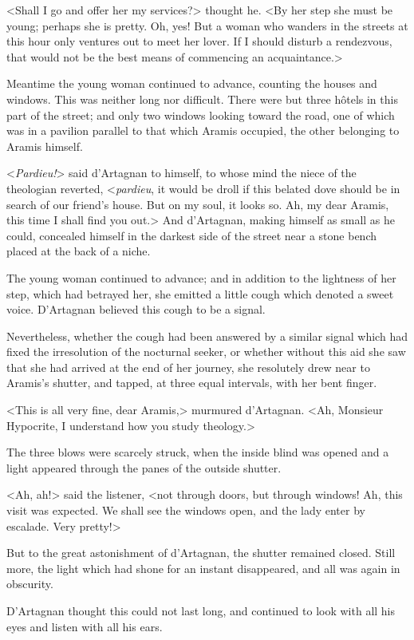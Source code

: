 <Shall I go and offer her my services?> thought he. <By her step she must be young; perhaps she is pretty. Oh, yes! But a woman who wanders in the streets at this hour only ventures out to meet her lover. If I should disturb a rendezvous, that would not be the best means of commencing an acquaintance.> 

Meantime the young woman continued to advance, counting the houses and windows. This was neither long nor difficult. There were but three hôtels in this part of the street; and only two windows looking toward the road, one of which was in a pavilion parallel to that which Aramis occupied, the other belonging to Aramis himself. 

<\textit{Pardieu!}> said d'Artagnan to himself, to whose mind the niece of the theologian reverted, <\textit{pardieu}, it would be droll if this belated dove should be in search of our friend's house. But on my soul, it looks so. Ah, my dear Aramis, this time I shall find you out.> And d'Artagnan, making himself as small as he could, concealed himself in the darkest side of the street near a stone bench placed at the back of a niche. 

The young woman continued to advance; and in addition to the lightness of her step, which had betrayed her, she emitted a little cough which denoted a sweet voice. D'Artagnan believed this cough to be a signal. 

Nevertheless, whether the cough had been answered by a similar signal which had fixed the irresolution of the nocturnal seeker, or whether without this aid she saw that she had arrived at the end of her journey, she resolutely drew near to Aramis's shutter, and tapped, at three equal intervals, with her bent finger. 

<This is all very fine, dear Aramis,> murmured d'Artagnan. <Ah, Monsieur Hypocrite, I understand how you study theology.> 

The three blows were scarcely struck, when the inside blind was opened and a light appeared through the panes of the outside shutter. 

<Ah, ah!> said the listener, <not through doors, but through windows! Ah, this visit was expected. We shall see the windows open, and the lady enter by escalade. Very pretty!> 

But to the great astonishment of d'Artagnan, the shutter remained closed. Still more, the light which had shone for an instant disappeared, and all was again in obscurity. 

D'Artagnan thought this could not last long, and continued to look with all his eyes and listen with all his ears. 

